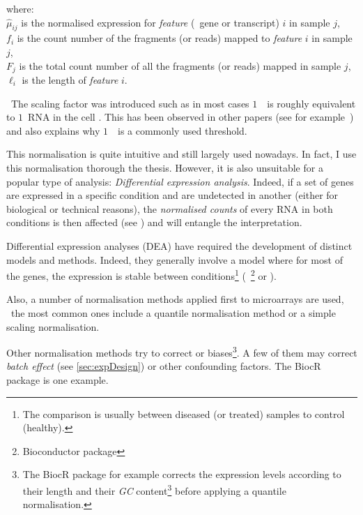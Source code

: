 where: \\{\small
$\hat{\mu}_{ij}$ is the normalised expression for \emph{feature} (\eg\ gene or
transcript) $i$ in sample $j$,\\
$f_i$ is the count number of the fragments (or reads) mapped to
\emph{feature} $i$ in sample $j$,\\
$F_j$ is the total count number of all the fragments (or reads) mapped in
sample $j$,\\
$\ell_i$ is the length of \emph{feature} $i$.
}

\NB\ The scaling factor was introduced such as in most cases $1$\ \FPKM\ is
roughly equivalent to $1$\ \gls{RNA} in the cell . This
has been observed in other papers (see for example~\cite{Hebenstreit:2011}) and
also explains why $1$\ \FPKM\ is a commonly used threshold.

This normalisation is quite intuitive and still largely used nowadays. In fact,
I use this normalisation thorough the thesis. However, it is also unsuitable for
a popular type of analysis: \emph{Differential expression analysis}. Indeed,
if a set of genes are expressed in a specific condition and are undetected in
another (either for biological or technical reasons), the \emph{normalised counts}
of every \gls{RNA} in both conditions is then affected (see )
and will entangle the interpretation.


Differential expression analyses (DEA)  have required the development of distinct
models and methods. Indeed, they generally involve a model where for most of the
genes, the expression is stable between conditions\footnote{The comparison is
usually between diseased (or treated) samples to control (healthy).} (\eg\
\footnote{\label{footnote:1}Bioconductor package} 
or \soft{DESeq2}\footref{footnote:1} \mycite{DESeq2}).

Also, a number of normalisation methods applied first to microarrays are used, \eg\
the most common ones include a quantile normalisation method or a simple scaling
normalisation.

Other normalisation methods try to correct  or  biases\footnote{The \gls{BiocR} package  
for example corrects the expression levels according to their length and
their \emph{GC} content\footnote{\glspl{cDNA} enriched in GC bases are stabler and
tend to a more optimal amplification.} before applying a quantile normalisation.}.
A few of them may correct \emph{batch effect} (see \cref{sec:expDesign}) or
other confounding factors. The \gls{BiocR} package \soft{RUVSeq} \mycite{ruvseq}
is one example.

